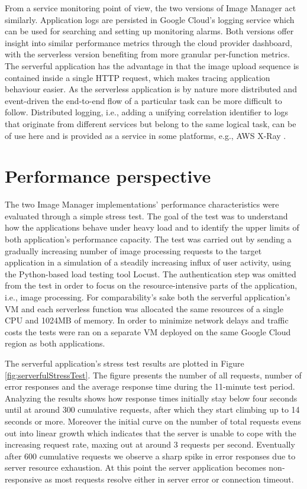 From a service monitoring point of view, the two versions of Image Manager act similarly. Application logs are persisted in Google Cloud's logging service which can be used for searching and setting up monitoring alarms. Both versions offer insight into similar performance metrics through the cloud provider dashboard, with the serverless version benefiting from more granular per-function metrics. The serverful application has the advantage in that the image upload sequence is contained inside a single HTTP request, which makes tracing application behaviour easier. As the serverless application is by nature more distributed and event-driven the end-to-end flow of a particular task can be more difficult to follow. Distributed logging, i.e., adding a unifying correlation identifier to logs that originate from different services but belong to the same logical task, can be of use here and is provided as a service in some platforms, e.g., AWS X-Ray \parencite{awslambda0218}.

\section{Performance perspective}

The two Image Manager implementations' performance characteristics were evaluated through a simple stress test. The goal of the test was to understand how the applications behave under heavy load and to identify the upper limits of both application's performance capacity. The test was carried out by sending a gradually increasing number of image processing requests to the target application in a simulation of a steadily increasing influx of user activity, using the Python-based load testing tool Locust. The authentication step was omitted from the test in order to focus on the resource-intensive parts of the application, i.e., image processing. For comparability's sake both the serverful application's VM and each serverless function was allocated the same resources of a single CPU and 1024MB of memory. In order to minimize network delays and traffic costs the tests were ran on a separate VM deployed on the same Google Cloud region as both applications.

The serverful application's stress test results are plotted in Figure \ref{fig:serverfulStressTest}. The figure presents the number of all requests, number of error responses and the average response time during the 11-minute test period. Analyzing the results shows how response times initially stay below four seconds until at around 300 cumulative requests, after which they start climbing up to 14 seconds or more. Moreover the initial curve on the number of total requests evens out into linear growth which indicates that the server is unable to cope with the increasing request rate, maxing out at around 3 requests per second. Eventually after 600 cumulative requests we observe a sharp spike in error responses due to server resource exhaustion. At this point the server application becomes non-responsive as most requests resolve either in server error or connection timeout.

